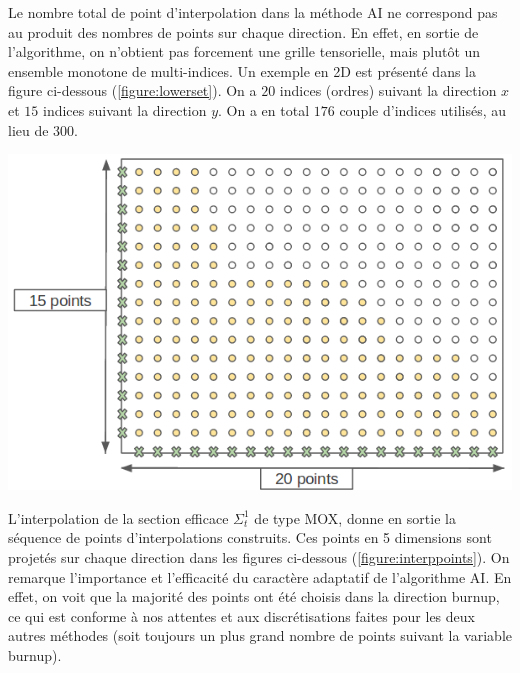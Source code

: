 \hspace{0.5cm} Le nombre total de point d'interpolation dans la méthode AI ne correspond pas au produit des nombres de points sur chaque direction. En effet, en sortie de l'algorithme, on n'obtient pas forcement une grille tensorielle, mais plutôt un ensemble monotone de multi-indices. Un exemple en 2D est présenté dans la figure ci-dessous (\ref{figure:lowerset}). On a $20$ indices (ordres) suivant la direction $x$ et $15$ indices suivant la direction $y$. On a en total $176$ couple d'indices utilisés, au lieu de $300$.

\begin{center}
\includegraphics[height= 7 cm,width = 0.7\linewidth]{images/nb_discretisation.png}
\label{figure:lowerset}
\end{center}

\hspace{0.5cm} L'interpolation de la section efficace $\Sigma_t^1$ de type MOX, donne en sortie la séquence de points d'interpolations construits. Ces points en 5 dimensions sont projetés sur chaque direction dans les figures ci-dessous (\ref{figure:interppoints}). On remarque l'importance et l'efficacité du caractère adaptatif de l'algorithme AI. En effet, on voit que la majorité des points ont été choisis dans la direction burnup, ce qui est conforme à nos attentes et aux discrétisations faites pour les deux autres méthodes (soit toujours un plus grand nombre de points suivant la variable burnup).\\


